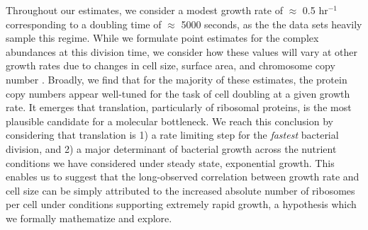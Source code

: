 Throughout our estimates, we consider a modest growth rate of $\approx$ 0.5
hr$^{-1}$ corresponding to a doubling time of $\approx$ 5000 seconds, as the the
data sets heavily sample this regime. While we formulate point estimates for the
complex abundances at this division time, we consider how these values will vary
at other growth rates due to changes in cell size, surface area, and chromosome
copy number \citep{taheriaraghi2015}. Broadly, we find that for the majority of
these estimates, the protein copy numbers appear well-tuned for the task of cell
doubling at a given growth rate. It emerges that translation, particularly
of ribosomal proteins, is the most plausible candidate for a molecular
bottleneck. We reach this conclusion by considering that translation is 1) a
rate limiting step for the \textit{fastest} bacterial division, and 2) a major
determinant of bacterial growth across the nutrient conditions we have
considered under steady state, exponential growth. This  enables us to suggest
that the long-observed correlation between growth rate and cell size
\citep{schaechter1958, si2017} can be simply attributed to the increased
absolute number of ribosomes per cell under conditions supporting extremely
rapid growth, a hypothesis which we formally mathematize and explore.





